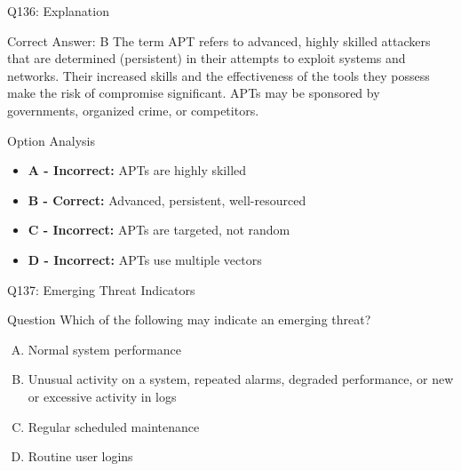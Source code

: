 \documentclass{beamer}
\begin{document}
	\begin{frame}{Q136: Explanation}
		\begin{block}{Correct Answer: B}
			The term APT refers to advanced, highly skilled attackers that are determined (persistent) in their attempts to exploit systems and networks. Their increased skills and the effectiveness of the tools they possess make the risk of compromise significant. APTs may be sponsored by governments, organized crime, or competitors.
		\end{block}
		\begin{block}{Option Analysis}
			\begin{itemize}
				\item \textbf{A - Incorrect:} APTs are highly skilled
				\item \textbf{B - Correct:} Advanced, persistent, well-resourced
				\item \textbf{C - Incorrect:} APTs are targeted, not random
				\item \textbf{D - Incorrect:} APTs use multiple vectors
			\end{itemize}
		\end{block}
	\end{frame}
	
	\begin{frame}{Q137: Emerging Threat Indicators}
		\begin{block}{Question}
			Which of the following may indicate an emerging threat?
		\end{block}
		\begin{enumerate}[(A)]
			\item Normal system performance
			\item Unusual activity on a system, repeated alarms, degraded performance, or new or excessive activity in logs
			\item Regular scheduled maintenance
			\item Routine user logins
		\end{enumerate}
	\end{frame}
	
\end{document}
